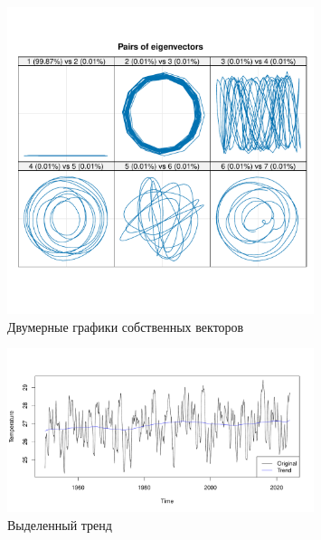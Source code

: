\documentclass[specialist,
substylefile = spbu_report.rtx,
subf,href,colorlinks=true, 12pt]{disser}
\theoremstyle{definition}
\begin{document}
\begin{figure}[h!]
	\centering
	\includegraphics[width=0.8\textwidth]{img/Nino_ssa_paired.pdf}
	\caption{Двумерные графики собственных векторов}
	\label{Nino_ssa_paired}
\end{figure}

\begin{figure}[h!]
	\centering
	\includegraphics[width=0.8\textwidth]{img/Nino_reconstruct_trend.pdf}
	\caption{Выделенный тренд}
	\label{Nino_reconstruct_trend}
\end{figure}
\end{document}
